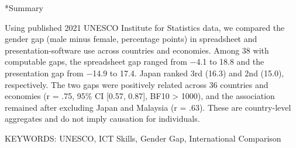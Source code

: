 \documentclass[a4paper,10pt,twocolumn]{ltjsarticle}
\makeatletter
\renewcommand{\section}{\@startsection{section}{1}{\z@}{1.1\Cvs \@plus.4\Cdp \@minus.2\Cdp}{.5\Cvs \@plus.2\Cdp}{\normalfont\gtfamily\bfseries\large}}
\makeatother
\begin{document}
\section*{Summary}
{\footnotesize\setlength{\parindent}{0pt}Using published 2021 UNESCO Institute for Statistics data, we compared the gender gap (male minus female, percentage points) in spreadsheet and presentation-software use across countries and economies. Among 38 with computable gaps, the spreadsheet gap ranged from −4.1 to 18.8 and the presentation gap from −14.9 to 17.4. Japan ranked 3rd (16.3) and 2nd (15.0), respectively. The two gaps were positively related across 36 countries and economies (r = .75, 95\% CI [0.57, 0.87], BF10 > 1000), and the association remained after excluding Japan and Malaysia (r = .63). These are country-level aggregates and do not imply causation for individuals.\par\smallskip KEYWORDS: UNESCO, ICT Skills, Gender Gap, International Comparison\par}
\medskip\noindent{}
\end{document}
